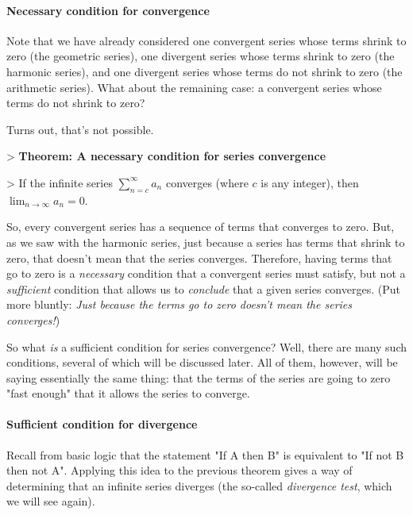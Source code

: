 \paragraph{Necessary condition for convergence}



Note that we have already considered one convergent series whose terms shrink to zero (the geometric series), one divergent series whose terms shrink to zero (the harmonic series), and one divergent series whose terms do not shrink to zero (the arithmetic series). What about the remaining case: a convergent series whose terms do not shrink to zero?



Turns out, that's not possible.



> \textbf{Theorem: A necessary condition for series convergence}

> If the infinite series $\sum _{n=c}^\infty a _n$ converges (where $c$ is any integer), then $\lim _{n\to\infty} a _n = 0$.



So, every convergent series has a sequence of terms that converges to zero. But, as we saw with the harmonic series, just because a series has terms that shrink to zero, that doesn't mean that the series converges. Therefore, having terms that go to zero is a \textit{necessary} condition that a convergent series must satisfy, but not a \textit{sufficient} condition that allows us to \textit{conclude} that a given series converges. (Put more bluntly: \textit{Just because the terms go to zero doesn't mean the series converges!})



So what \textit{is} a sufficient condition for series convergence? Well, there are many such conditions, several of which will be discussed later. All of them, however, will be saying essentially the same thing: that the terms of the series are going to zero "fast enough" that it allows the series to converge.



\paragraph{Sufficient condition for divergence}



Recall from basic logic that the statement "If A then B" is equivalent to "If not B then not A". Applying this idea to the previous theorem gives a way of determining that an infinite series diverges (the so-called \textit{divergence test}, which we will see again).



